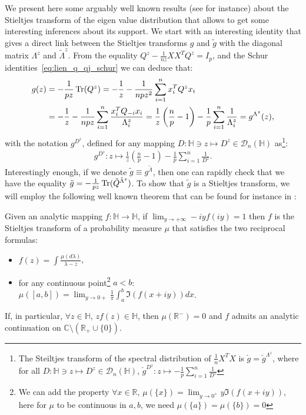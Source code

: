 \documentclass[a4papaer, titlepage]{book}
\begin{document}
We present here some arguably well known results (see \cite{kammoun2016no} for instance) about the Stieltjes transform of the eigen value distribution that allows to get some interesting inferences about its support. We start with an interesting identity that gives a direct link between the Stieltjes transforms $g$ and $\tilde g$ with the diagonal matrix $\Lambda^z$ and $\tilde \Lambda^z$. From the equality $Q^z - \frac{1}{nz} XX^TQ^z = I_p$, and the Schur identities~\eqref{eq:lien_q_qj_schur} we can deduce that:
\begin{align*}
  g(z) 
  &=-\frac{1}{pz} \operatorname{Tr}(Q^z)
  = -\frac{1}{z} - \frac{1}{npz^2} \sum_{i=1}^n x_i^TQ^zx_i\\
  &=-\frac{1}{z} - \frac{1}{npz}\sum_{i=1}^n \frac{x_i^T Q_{-i}x_i}{\Lambda^z_i}
  =\frac{1}{z} \left(\frac{n}{p} - 1\right) - \frac{1}{p} \sum_{i=1}^n \frac{1}{\Lambda_i^z}
  = g^{\Lambda^z}(z),
\end{align*}
with the notation $g^{D^z}$, defined for any mapping $D: \mathbb H\ni z \mapsto D^z \in\mathcal D_n(\mathbb H)$ as\footnote{The Steiltjes transform of the spectral distribution of $\frac{1}{n}X^TX$ is $\check g = \check g^{\Lambda^z}$, where for all $D: \mathbb H\ni z \mapsto D^z \in\mathcal D_n(\mathbb H)$, $\check g^{D^z} : z \longmapsto  - \frac{1}{p} \sum_{i=1}^n \frac{1}{D^z}$}:
\begin{align*}
  g^{D^z} : z \longmapsto \frac{1}{z} \left(\frac{n}{p} - 1\right) - \frac{1}{p} \sum_{i=1}^n \frac{1}{D^z}.
\end{align*}
Interestingly enough, if we denote $\tilde g \equiv  g^{\tilde \Lambda}$, then one can rapidly check that we have the equality $\tilde g = -\frac{1}{pz} \operatorname{Tr}(\tilde Q^{\tilde \Lambda^z})$.
To show that $\tilde g$ is a Stieltjes transform, we will employ the following well known theorem that can be found for instance in \cite{BOL97}:
\begin{theorem}\label{the:condition_stieltjes transform}
  Given an analytic mapping $f: \mathbb H \to \mathbb H$, if $\lim_{y \to +\infty} -iyf(iy) = 1$ then $f$ is the Stieltjes transform of a probability measure $\mu$ that satisfies the two reciprocal formulas:
  \begin{itemize}
    \item $f(z) = \int \frac{\mu(d \lambda)}{\lambda - z}$,
    \item for any continuous point\footnote{We can add the property $\forall x \in \mathbb R$, $\mu(\{x\}) = \lim_{y \to 0^+} y \Im (f(x+iy))$, here for $\mu$ to be continuous in $a,b$, we need $\mu(\{a\}) = \mu(\{b\}) = 0$} $a<b$: $\mu([a,b]) = \lim_{y\to 0+}\frac{1}{\pi} \int_a^b \Im(f(x+iy))dx$.
  \end{itemize}
  If, in particular, $\forall z \in \mathbb H$, $zf(z) \in \mathbb H$, then $\mu(\mathbb R^-) = 0$ and $f$ admits an analytic continuation on $\mathbb C \setminus (\mathbb R_+ \cup \{0\})$.
\end{theorem}
\end{document}
